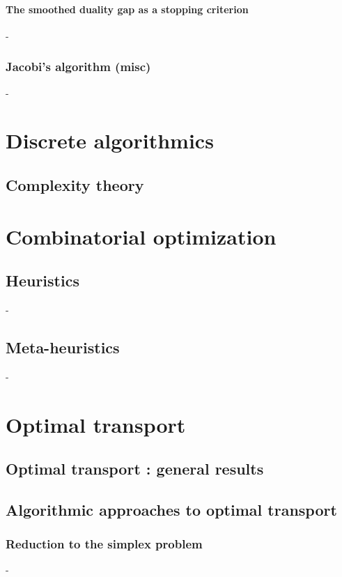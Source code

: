 \documentclass[12pt,openany,oneside]{book}
\theoremstyle{definition}
\numberwithin{definition}{section}
\numberwithin{theorem}{section}
\numberwithin{corollary}{section}
\numberwithin{proposition}{section}
\numberwithin{notation}{section}
\numberwithin{remark}{section}
\numberwithin{hypothesis}{section}
\numberwithin{example}{section}
\begin{document}
\subsection{The smoothed duality gap as a stopping criterion}-
\section{Jacobi's algorithm (misc)}-

\part{Discrete algorithmics}

\chapter{Complexity theory}



\part{Combinatorial optimization}

\chapter{Heuristics}\label{chap:heuristics}-
\chapter{Meta-heuristics}\label{chap:meta-heuristics}-

\part{Optimal transport}

\chapter{Optimal transport : general  results}

\chapter{Algorithmic approaches to optimal transport}

\section{Reduction to the simplex problem}-
\end{document}

